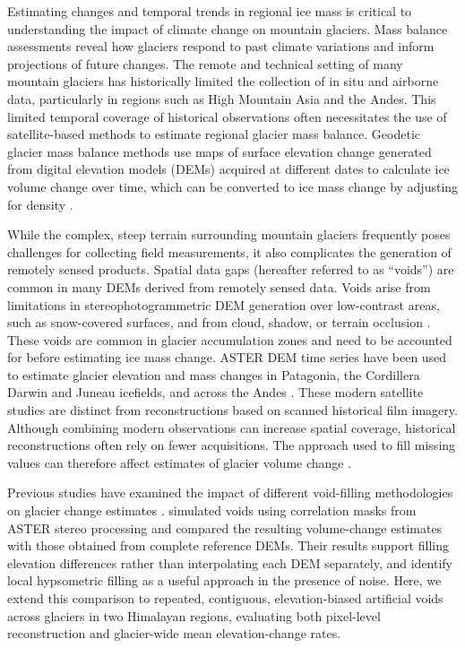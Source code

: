 \documentclass[tc,manuscript]{copernicus}
\begin{document}
Estimating changes and temporal trends in regional ice mass is critical to understanding the impact of climate change on mountain glaciers. Mass balance assessments reveal how glaciers respond to past climate variations and inform projections of future changes. The remote and technical setting of many mountain glaciers has historically limited the collection of in situ and airborne data, particularly in regions such as High Mountain Asia and the Andes. This limited temporal coverage of historical observations often necessitates the use of satellite-based methods to estimate regional glacier mass balance. Geodetic glacier mass balance methods use maps of surface elevation change generated from digital elevation models (DEMs) acquired at different dates to calculate ice volume change over time, which can be converted to ice mass change by adjusting for density \citep{berthier2023, huss2013, bamber2007}. 

While the complex, steep terrain surrounding mountain glaciers frequently poses challenges for collecting field measurements, it also complicates the generation of remotely sensed products. Spatial data gaps (hereafter referred to as “voids”) are common in many DEMs derived from remotely sensed data. Voids arise from limitations in stereophotogrammetric DEM generation over low-contrast areas, such as snow-covered surfaces, and from cloud, shadow, or terrain occlusion \citep{girod2017, hugonnet2022}. These voids are common in glacier accumulation zones and need to be accounted for before estimating ice mass change. ASTER DEM time series have been used to estimate glacier elevation and mass changes in Patagonia, the Cordillera Darwin and Juneau icefields, and across the Andes \citep{willis2012,melkonian2013,melkonian2014,dussaillant2018,dussaillant2019}. These modern satellite studies are distinct from reconstructions based on scanned historical film imagery. Although combining modern observations can increase spatial coverage, historical reconstructions often rely on fewer acquisitions. The approach used to fill missing values can therefore affect estimates of glacier volume change \citep{mcnabb2019}.


Previous studies have examined the impact of different void-filling methodologies on glacier change estimates \citep[e.g.,][]{mcnabb2019, kaab2008, seehaus2020}. \citet{mcnabb2019} simulated voids using correlation masks from ASTER stereo processing and compared the resulting volume-change estimates with those obtained from complete reference DEMs. Their results support filling elevation differences rather than interpolating each DEM separately, and identify local hypsometric filling as a useful approach in the presence of noise. Here, we extend this comparison to repeated, contiguous, elevation-biased artificial voids across glaciers in two Himalayan regions, evaluating both pixel-level reconstruction and glacier-wide mean elevation-change rates.
\end{document}
